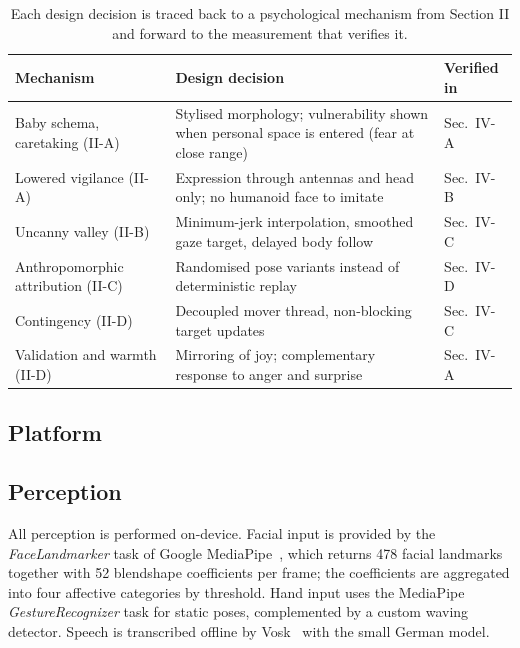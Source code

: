 \documentclass[conference]{IEEEtran}
\begin{document}
\begin{table}[!h]
    \centering
    \setlength{\tabcolsep}{0.35em}
    {\renewcommand{\arraystretch}{1.25}\footnotesize
    \begin{tabular}{|p{1.9cm}|p{3.4cm}|p{1.5cm}|}
        \hline
        \textbf{Mechanism} & \textbf{Design decision} & \textbf{Verified in} \\ \hline
        Baby schema, caretaking (II-A) & Stylised morphology; vulnerability shown when personal space is entered (fear at close range) & Sec.~IV-A \\ \hline
        Lowered vigilance (II-A) & Expression through antennas and head only; no humanoid face to imitate & Sec.~IV-B \\ \hline
        Uncanny valley (II-B) & Minimum-jerk interpolation, smoothed gaze target, delayed body follow & Sec.~IV-C \\ \hline
        Anthropomorphic attribution (II-C) & Randomised pose variants instead of deterministic replay & Sec.~IV-D \\ \hline
        Contingency (II-D) & Decoupled mover thread, non-blocking target updates & Sec.~IV-C \\ \hline
        Validation and warmth (II-D) & Mirroring of joy; complementary response to anger and surprise & Sec.~IV-A \\ \hline
    \end{tabular}}
    \caption{Each design decision is traced back to a psychological mechanism
    from Section II and forward to the measurement that verifies it.}
    \label{tab:rationale}
\end{table}

\subsection{Platform}

\subsection{Perception}
All perception is performed on-device. Facial input is provided by the
\textit{FaceLandmarker} task of Google MediaPipe~\cite{Lugaresi2019MediaPipe},
which returns 478 facial landmarks together with 52 blendshape coefficients
per frame; the coefficients are aggregated into four affective categories by
threshold. Hand input uses the MediaPipe \textit{GestureRecognizer} task for
static poses, complemented by a custom waving detector. Speech is transcribed
offline by Vosk~\cite{Vosk} with the small German model.
\end{document}
